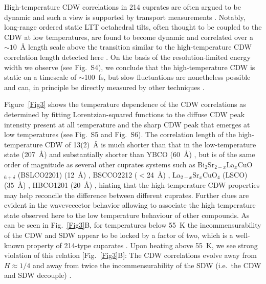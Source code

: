 \documentclass[9pt,twocolumn,twoside]{pnas-new}
\begin{document}
High-temperature CDW correlations in 214 cuprates are often argued to be dynamic \cite{Kivelson2003, Reznik2006, Vojta2009} and such a view is supported by transport measurements \cite{Li2007}. Notably, long-range ordered static LTT octahedral tilts, often thought to be coupled to the CDW at low temperatures, are found to become dynamic and correlated over a $\sim 10$~\AA{} length scale above the transition similar to the high-temperature CDW correlation length detected here \cite{Bozin2015,Fabbris2013}. On the basis of the resolution-limited energy width we observe (see Fig.~S4), we conclude that the high-temperature CDW is static on a timescale of $\sim$100~fs, but slow fluctuations are nonetheless possible and can, in principle be directly measured by other techniques \cite{Chen2016}. 

Figure~\ref{Fig3} shows the temperature dependence of the CDW correlations as determined by fitting Lorentzian-squared functions to the diffuse CDW peak intensity present at all temperature and the sharp CDW peak that emerges at low temperatures (see Fig.~S5 and Fig.~S6). The correlation length of the high-temperature CDW of 13(2)~\AA{} is much shorter than that in the low-temperature state  (207~\AA{}) and substantially shorter than  YBCO (60~\AA) \cite{Ghiringhelli2012}, but is of the same order of magnitude as several other cuprates systems such as  Bi$_2$Sr$_{2-x}$La$_x$CuO$_{6+\delta}$ (BSLCO2201) (12~\AA{}) \cite{Comin2014}, BSCCO2212 ($<$24~\AA{}) \cite{Hashimoto2014}, La$_{2-x}$Sr$_x$CuO$_4$ (LSCO) (35~\AA{}) \cite{Thampy2014}, HBCO1201 (20~\AA{}) \cite{tabis2014}, hinting that the high-temperature CDW properties may help reconcile the difference between different cuprates. Further clues are evident in the wavevecector behavior allowing to associate the high temperature state observed here to the low temperature behaviour of other compounds. As can be seen in Fig.~\ref{Fig3}B, for temperatures below 55~K the incommensurability of the CDW and SDW appear to be locked by a factor of two, which is a well-known property of 214-type cuparates \cite{Cheong1991, Thurston1992, Tranquada1995, Hucker2011, Fujita2004}. Upon heating above 55~K, we see strong violation of this relation [Fig.~\ref{Fig3}B]: The CDW correlations evolve away from $H\approx 1/4$ and away from twice the incommensurability of the SDW (i.e.\ the CDW and SDW decouple) \cite{Fujita2004}. 
\end{document}
